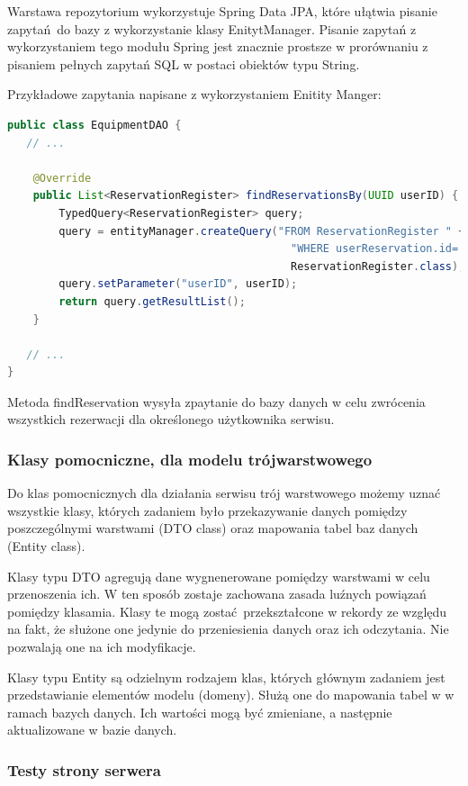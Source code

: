 \documentclass{article}
\begin{document}
Warstawa repozytorium wykorzystuje Spring Data JPA, które ułątwia pisanie zapytań do bazy z wykorzystanie klasy EnitytManager. Pisanie zapytań z wykorzystaniem
tego modułu Spring jest znacznie prostsze w prorównaniu z pisaniem pełnych zapytań SQL w postaci obiektów typu String. 

Przykładowe zapytania napisane z wykorzystaniem Enitity Manger:
\begin{lstlisting}[language=Java, breaklines=true, caption=Przykładowy zapytanie do bazy z warstwy repozytorium, label=lst:wr]
public class EquipmentDAO {
   // ...

    @Override
    public List<ReservationRegister> findReservationsBy(UUID userID) {
        TypedQuery<ReservationRegister> query;
        query = entityManager.createQuery("FROM ReservationRegister " +
                                            "WHERE userReservation.id=:userID",
                                            ReservationRegister.class);
        query.setParameter("userID", userID);
        return query.getResultList();
    }

   // ...
}
\end{lstlisting}

Metoda findReservation wysyła zpaytanie do bazy danych w celu zwrócenia wszystkich rezerwacji dla określonego użytkownika serwisu.

\subsubsection{Klasy pomocniczne, dla modelu trójwarstwowego}

Do klas pomocnicznych dla działania serwisu trój warstwowego możemy uznać wszystkie klasy, których zadaniem było przekazywanie danych pomiędzy poszczególnymi
warstwami (DTO class) oraz mapowania tabel baz danych (Entity class).

Klasy typu DTO agregują dane wygnenerowane pomiędzy warstwami w celu przenoszenia ich. W ten sposób zostaje zachowana zasada luźnych powiązań pomiędzy klasamia.
Klasy te mogą zostać przekształcone w rekordy ze względu na fakt, że służone one jedynie do przeniesienia danych oraz ich odczytania. Nie pozwalają one na ich modyfikacje.

Klasy typu Entity są odzielnym rodzajem klas, których głównym zadaniem jest przedstawianie elementów modelu (domeny). Służą one do mapowania tabel w w ramach bazych danych.
Ich wartości mogą być zmieniane, a następnie aktualizowane w bazie danych.

\subsubsection{Testy strony serwera}
\end{document}
